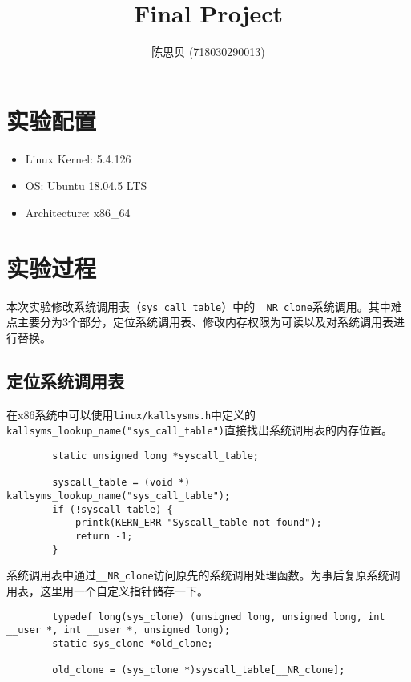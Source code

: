\documentclass[UTF8]{ctexrep}
\title{
    \horrule{0.5pt} \\[0.4cm]
    \huge Final Project \\
    \horrule{2pt}
}
\author{
    陈思贝 (718030290013)
}
\date{
}
\begin{document}
    \maketitle

    \section{实验配置}

    \begin{itemize}
        \item Linux Kernel: 5.4.126
        \item OS: Ubuntu 18.04.5 LTS
        \item Architecture: x86\_64
    \end{itemize}
    \vspace{.3cm}

    \section{实验过程}

    本次实验修改系统调用表（\texttt{sys\_call\_table}）中的\texttt{\_\_NR\_clone}系统调用。其中难点主要分为3个部分，定位系统调用表、修改内存权限为可读以及对系统调用表进行替换。\\

    \subsection{定位系统调用表}

    在x86系统中可以使用\texttt{linux/kallsysms.h}中定义的\texttt{kallsyms\_lookup\_name("sys\_call\_table")}直接找出系统调用表的内存位置。

    \begin{lstlisting}
        static unsigned long *syscall_table;

        syscall_table = (void *) kallsyms_lookup_name("sys_call_table");
        if (!syscall_table) {
            printk(KERN_ERR "Syscall_table not found");
            return -1;
        }\end{lstlisting}

    系统调用表中通过\texttt{\_\_NR\_clone}访问原先的系统调用处理函数。为事后复原系统调用表，这里用一个自定义指针储存一下。
    \begin{lstlisting}
        typedef long(sys_clone) (unsigned long, unsigned long, int __user *, int __user *, unsigned long);
        static sys_clone *old_clone;
        
        old_clone = (sys_clone *)syscall_table[__NR_clone];\end{lstlisting}
\end{document}
